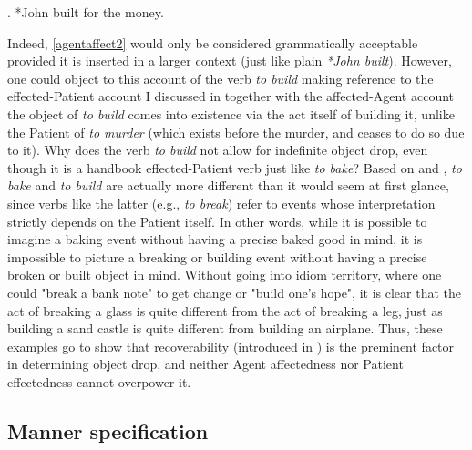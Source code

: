 \ex. \label{agentaffect2} *John built for the money.

Indeed, \ref{agentaffect2} would only be considered grammatically acceptable provided it is inserted in a larger context (just like plain \textit{*John built}). However, one could object to this account of the verb \textit{to build} making reference to the effected-Patient account I discussed in  together with the affected-Agent account \textemdash the object of \textit{to build} comes into existence via the act itself of building it, unlike the Patient of \textit{to murder} (which exists before the murder, and ceases to do so due to it). Why does the verb \textit{to build} not allow for indefinite object drop, even though it is a handbook effected-Patient verb just like \textit{to bake}? Based on \textcite[512]{Goldberg2001} and \textcite[139]{Naess2007}, \textit{to bake} and \textit{to build} are actually more different than it would seem at first glance, since verbs like the latter (e.g., \textit{to break}) refer to events whose interpretation strictly depends on the Patient itself. In other words, while it is possible to imagine a baking event without having a precise baked good in mind, it is impossible to picture a breaking or building event without having a precise broken or built object in mind. Without going into idiom territory, where one could "break a bank note" to get change or "build one's hope", it is clear that the act of breaking a glass is quite different from the act of breaking a leg, just as building a sand castle is quite different from building an airplane. Thus, these examples go to show that recoverability (introduced in ) is the preminent factor in determining object drop, and neither Agent affectedness nor Patient effectedness cannot overpower it.


\subsection{Manner specification} 

